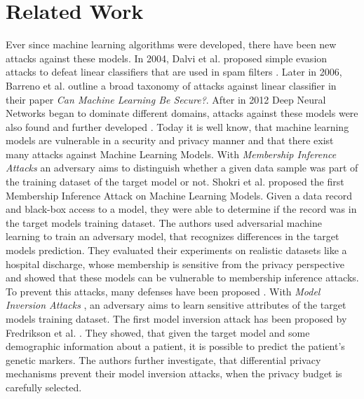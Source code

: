 \chapter{Related Work}

  Ever since machine learning algorithms were developed, there have been new attacks against these models.
  In 2004, Dalvi et al. proposed simple evasion attacks to defeat linear classifiers that are used in spam filters \cite{10.1145/1014052.1014066}.
  Later in 2006, Barreno et al. outline a broad taxonomy of attacks against linear classifier in their paper \emph{Can Machine Learning Be Secure?}\cite{10.1145/1128817.1128824}.
  After in 2012 Deep Neural Networks began to dominate different domains, attacks against these models were also found and further developed \cite{szegedy2014intriguing, Biggio_2018}.
  Today it is well know, that machine learning models are vulnerable in a security and privacy manner and that there exist many attacks against Machine Learning Models.
  With \emph{Membership Inference Attacks} \cite{carlini2019secret, chen2018differentially, 7958568, truex2019demystifying, hayes2018logan} an adversary aims to distinguish whether a given data sample was part of the training dataset of the target model or not.
  Shokri et al. \cite{7958568} proposed the first Membership Inference Attack on Machine Learning Models.
  Given a data record and black-box access to a model, they were able to determine if the record was in the target models training dataset.
  The authors used adversarial machine learning to train an adversary model, that recognizes differences in the target models prediction.
  They evaluated their experiments on realistic datasets like a hospital discharge, whose membership is sensitive from the privacy perspective and showed that these models can be vulnerable to membership inference attacks. To prevent this attacks, many defenses have been proposed \cite{10.1145/3319535.3363201, 7958568, salem2018mlleaks, Li_2021}.
  With \emph{Model Inversion Attacks} \cite{PMID:27077138, 8476925, 10.1145/2810103.2813677, chen2020improved}, an adversary aims to learn sensitive attributes of the target models training dataset.
  The first model inversion attack has been proposed by Fredrikson et al. \cite{PMID:27077138}.
  They showed, that given the target model and some demographic information about a patient, it is possible to predict the patient's genetic markers.
  The authors further investigate, that differential privacy mechanisms prevent their model inversion attacks, when the privacy budget is carefully selected.
